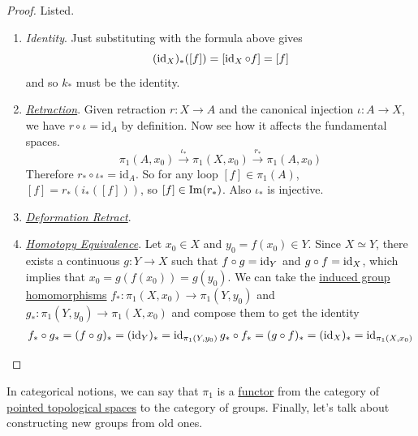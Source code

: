 	\begin{proof}
	  Listed. 
		\begin{enumerate}
		  \item \textit{Identity}. Just substituting with the formula above gives 
				\begin{equation}
					(\operatorname{id}_X)_\ast ([f]) = [\operatorname{id}_X \circ f] = [f]
				\end{equation}
				and so $k_\ast$ must be the identity. 
			
			\item \textit{\hyperref[def:retraction]{Retraction}}. Given retraction $r: X \to A$ and the canonical injection $\iota: A \to X$, we have $r \circ \iota = \mathrm{id}_A$ by definition. Now see how it affects the fundamental spaces. 
				\begin{equation}
					\pi_1 (A, x_0) \xrightarrow{\iota_\ast} \pi_1 (X, x_0) \xrightarrow{r_\ast} \pi_1 (A, x_0)
				\end{equation}
				Therefore $r_\ast \circ \iota_\ast = \mathrm{id}_A$. So for any loop $[f] \in \pi_1 (A)$, $[f] = r_\ast (i_\ast ([f]))$, so $[f] \in \operatorname{Im}(r_\ast)$. Also $\iota_\ast$ is injective. 

			\item \textit{\hyperref[def:deformation-retract]{Deformation Retract}}. 

			\item \textit{\hyperref[def:homotopy-equivalence]{Homotopy Equivalence}}. Let $x_0 \in X$ and $y_0 = f(x_0) \in Y$. Since $X \simeq Y$, there exists a continuous $g: Y \to X$ such that $f \circ g = \operatorname{id}_Y$ and $g \circ f = \operatorname{id}_X$, which implies that $x_0 = g(f(x_0)) = g(y_0)$. We can take the \hyperref[def:induced-group-homomorphism]{induced group homomorphisms} $f_\ast : \pi_1 (X, x_0) \to \pi_1 (Y, y_0)$ and $g_\ast: \pi_1 (Y, y_0) \to \pi_1 (X, x_0)$ and compose them to get the identity
				\begin{align}
					f_\ast \circ g_\ast = (f \circ g)_\ast = (\operatorname{id}_Y)_\ast = \operatorname{id}_{\pi_1 (Y, y_0)}
					g_\ast \circ f_\ast = (g \circ f)_\ast = (\operatorname{id}_X)_\ast = \operatorname{id}_{\pi_1 (X, x_0)}
				\end{align}
		\end{enumerate}
	\end{proof}

  In categorical notions, we can say that $\pi_1$ is a \hyperref[cat-def:functor]{functor} from the category of \hyperref[def:pointed-topological-space]{pointed topological spaces} to the category of groups. Finally, let's talk about constructing new groups from old ones. 

